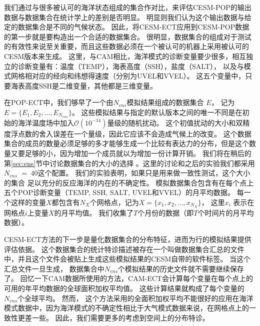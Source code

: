  
我们通过与很多被认可的海洋状态组成的集合作对比，来评估CESM-POP的输出数据与数据集合在统计学上的差别是否明显。
明显则我们认为这个输出数据与给定的数据集合是不同的气候状态。 
因此，将CESM-ECT应用到CESM-POP数据的第一步就是要构造出一个合适的数据集合。 
很明显，数据集合的组成对于测试的有效性来说至关重要，而且这些数据必须在一个被认可的机器上采用被认可的CESM版本来生成。
这里，与CAM相比，海洋模式的诊断变量要少很多，相互独立的诊断变量有：温度（TEMP），海表高度（SSH），盐度（SALT）， 以及与模式网格相对应的经向和纬想得速度（分别为UVEL和VVEL）。
这五个变量中，只要海表高度SSH是二维变量，其他都是三维变量。 

 
在POP-ECT中，我们够早了一个由$N_{ens}$模拟结果组成的数据集合 $E$， 记为 $E =\{E_1, E_2, \dots, E_{N_{ens}} \}$。
这些模拟结果与指定的默认版本之间的唯一不同是在初始的海洋温度场中加入$\mathcal{O}(10^{-14})$量级的随机扰动。 
这个初值扰动的大小和双精度浮点数的舍入误差在一个量级，因此它应该不会造成气候上的改变。
这个数据集合的成员的数量必须足够的多才能够生成一个比较有表达力的分布，但是这个数量又要足够的小，因为增加一个成员就以为增加一份计算开销。 
我们将在稍后的第\ref{sec:ens}节中讨论数据集合的大小的选择 。这里的讨论和之后的实验我们都采用 $N_{ens} \;=\; 40$这个配置。
我们的实验表明，如果只是用来做一致性测试，这个大小的集合 足以充分的反应海洋的内在的不确定性。
模拟数据集合包含有在每个点上五个POP诊断变量（TEMP, SSH, SALT, UVEL和VVEL）的月平均数据。
每一个这样的变量$X$都包含有$N_X$个网格点，记为${X} = \{ x_1, x_2, \dots, x_{N_X}\}$， 这里$x_i$ 表示在网格点$i$上变量$X$的月平均值。
我们收集了$T$个月份的数据（即$T$个时间片的月平均数据）。

 
CESM-ECT方法的下一步是量化数据集合的分布特征，进而为行的模拟结果提供评估依据。
这个数据集合的统计特诊描述被存在一个叫做数据集合汇总的文件中，并且这个文件会被贴上生成这些模拟结果的CESM自带的软件标签。
当这个汇总文件一旦生成， 数据集合中$N_{ens}$个模拟结果的历史文件就不需要继续保存了。 
回忆一下CAM数据所使用的方法，CAM-ECT会计算每个变量在每个点上的可用的年平均数据的全球面积加权平均值。
这些计算结果就构成了每个变量的$N_{ens}$个全球平均。 
然而， 这个方法采用的全面积加权平均不能很好的应用在海洋模式数据中，因为海洋模式的不确定性相比于大气模式数据来说，在网格点上的一致性更差一些。
因此，我们需要更多的考虑到空间上的分布特诊。 


